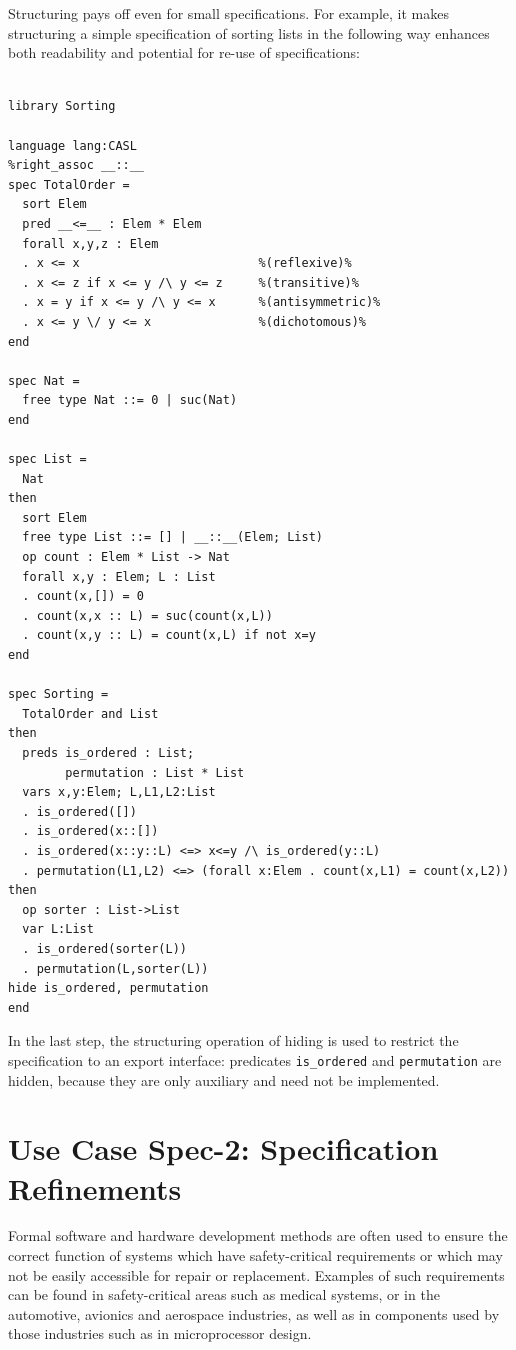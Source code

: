 \documentclass[10pt,fleqn,final]{scrreprt}
\newenvironment{definitions}[0]{\medskip }{}
\begin{document}
\begin{definitions}
Structuring pays off even for small specifications. For example, it makes
structuring a simple specification of sorting lists in the 
following way enhances both readability and potential for re-use
of specifications:

\begin{lstlisting}[basicstyle=\ttfamily\footnotesize,language=dolText,alsolanguage=CASL,escapechar=@,mathescape]	
%prefix( lang:  <http://purl.net/DOL/languages/> )%

library Sorting

language lang:CASL
%right_assoc __::__
spec TotalOrder =
  sort Elem
  pred __<=__ : Elem * Elem
  forall x,y,z : Elem
  . x <= x                         %(reflexive)%
  . x <= z if x <= y /\ y <= z     %(transitive)%
  . x = y if x <= y /\ y <= x      %(antisymmetric)%
  . x <= y \/ y <= x               %(dichotomous)%
end

spec Nat =
  free type Nat ::= 0 | suc(Nat)
end

spec List =
  Nat
then
  sort Elem
  free type List ::= [] | __::__(Elem; List)
  op count : Elem * List -> Nat
  forall x,y : Elem; L : List
  . count(x,[]) = 0
  . count(x,x :: L) = suc(count(x,L))
  . count(x,y :: L) = count(x,L) if not x=y
end

spec Sorting =
  TotalOrder and List
then
  preds is_ordered : List;
        permutation : List * List
  vars x,y:Elem; L,L1,L2:List
  . is_ordered([])
  . is_ordered(x::[])
  . is_ordered(x::y::L) <=> x<=y /\ is_ordered(y::L)
  . permutation(L1,L2) <=> (forall x:Elem . count(x,L1) = count(x,L2))
then
  op sorter : List->List
  var L:List
  . is_ordered(sorter(L))
  . permutation(L,sorter(L))
hide is_ordered, permutation
end
\end{lstlisting}

In the last step, the structuring operation of hiding is used to
restrict the specification to an export interface: 
 predicates \texttt{is\_ordered} and \texttt{permutation} are hidden, because they
are only auxiliary and need not be implemented.


\section{Use Case Spec-2: Specification Refinements}\label{spec-2}
Formal software and hardware development methods are often used to
ensure the correct function of systems which have safety-critical
requirements or which may not be easily accessible for repair or
replacement.  Examples of such requirements can be found in
safety-critical areas such as medical systems, or in the automotive,
avionics and aerospace industries, as well as in components used by
those industries such as in microprocessor design.


\end{definitions}
\end{document}
